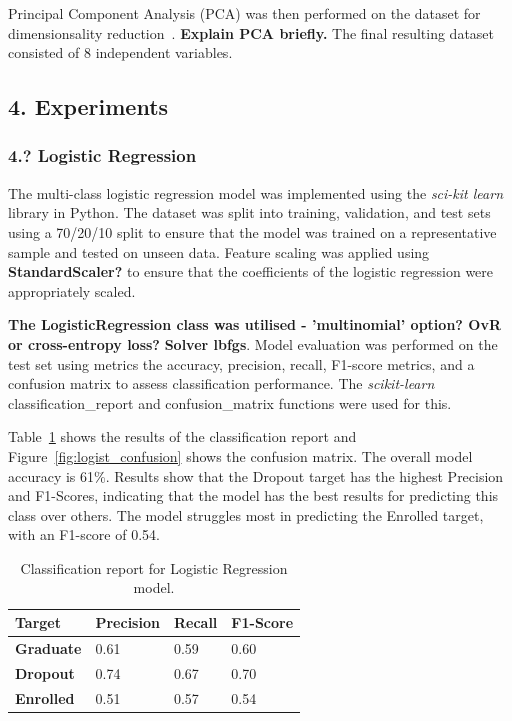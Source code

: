 \documentclass[12pt]{article}
\begin{document}
Principal Component Analysis (PCA) was then performed on the dataset for dimensionsality reduction~\cite{Gewers2021}. \textbf{Explain PCA briefly.} The final resulting dataset consisted of 8 independent variables.

\newpage
\subsection*{4. Experiments}
\subsubsection*{4.? Logistic Regression}

The multi-class logistic regression model was implemented using the \textit{sci-kit learn} library in Python. The dataset was split into training, validation, and test sets using a 70/20/10 split to ensure that the model was trained on a representative sample and tested on unseen data. Feature scaling was applied using \textbf{StandardScaler?} to ensure that the coefficients of the logistic regression were appropriately scaled.

\textbf{The LogisticRegression class was utilised - 'multinomial' option? OvR or cross-entropy loss?} \textbf{Solver lbfgs}. Model evaluation was performed on the test set using metrics the accuracy, precision, recall, F1-score metrics, and a confusion matrix to assess classification performance. The \textit{scikit-learn} classification\_report and confusion\_matrix functions were used for this. 

Table~\ref{tab:logist_results} shows the results of the classification report and Figure~\ref{fig:logist_confusion} shows the confusion matrix. The overall model accuracy is 61\%. Results show that the Dropout target has the highest Precision and F1-Scores, indicating that the model has the best results for predicting this class over others. The model struggles most in predicting the Enrolled target, with an F1-score of 0.54.
 
\begin{table}[h!]
  \centering
  \begin{tabular}{ | m{2.5cm} || m{2cm} | m{2cm} | m{2cm} | } 
    \hline
    \textbf{Target} & \textbf{Precision} & \textbf{Recall} & \textbf{F1-Score} \\ 
    \hline
    \hline
    \textbf{Graduate} & 0.61 & 0.59 & 0.60 \\ 
    \hline
    \textbf{Dropout} & 0.74 & 0.67 & 0.70 \\ 
    \hline
    \textbf{Enrolled} & 0.51 & 0.57 & 0.54 \\
    \hline
  \end{tabular}
  \caption{Classification report for Logistic Regression model.}
  \label{tab:logist_results}
\end{table}
\end{document}
